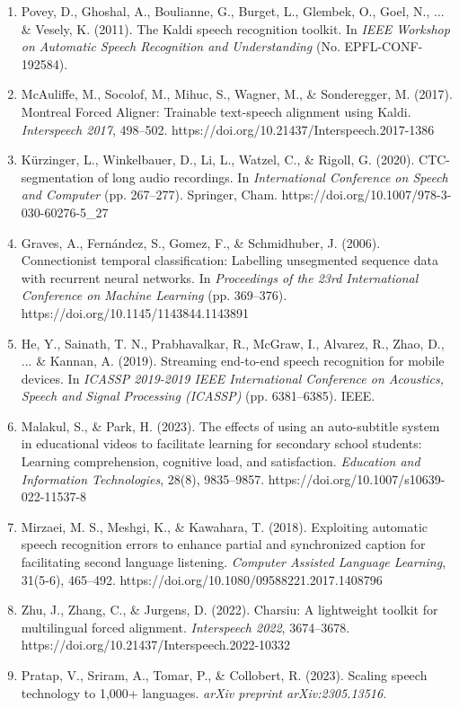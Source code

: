 \documentclass[12pt,a4paper]{article}
\begin{document}
\begin{enumerate}
    \item Povey, D., Ghoshal, A., Boulianne, G., Burget, L., Glembek, O., Goel, N., ... \& Vesely, K. (2011). The Kaldi speech recognition toolkit. In \textit{IEEE Workshop on Automatic Speech Recognition and Understanding} (No. EPFL-CONF-192584).
    \item McAuliffe, M., Socolof, M., Mihuc, S., Wagner, M., \& Sonderegger, M. (2017). Montreal Forced Aligner: Trainable text-speech alignment using Kaldi. \textit{Interspeech 2017}, 498--502. https://doi.org/10.21437/Interspeech.2017-1386
    \item K\"urzinger, L., Winkelbauer, D., Li, L., Watzel, C., \& Rigoll, G. (2020). CTC-segmentation of long audio recordings. In \textit{International Conference on Speech and Computer} (pp. 267--277). Springer, Cham. https://doi.org/10.1007/978-3-030-60276-5_27
    \item Graves, A., Fern\'andez, S., Gomez, F., \& Schmidhuber, J. (2006). Connectionist temporal classification: Labelling unsegmented sequence data with recurrent neural networks. In \textit{Proceedings of the 23rd International Conference on Machine Learning} (pp. 369--376). https://doi.org/10.1145/1143844.1143891
    \item He, Y., Sainath, T. N., Prabhavalkar, R., McGraw, I., Alvarez, R., Zhao, D., ... \& Kannan, A. (2019). Streaming end-to-end speech recognition for mobile devices. In \textit{ICASSP 2019-2019 IEEE International Conference on Acoustics, Speech and Signal Processing (ICASSP)} (pp. 6381--6385). IEEE.
    \item Malakul, S., \& Park, H. (2023). The effects of using an auto-subtitle system in educational videos to facilitate learning for secondary school students: Learning comprehension, cognitive load, and satisfaction. \textit{Education and Information Technologies}, 28(8), 9835--9857. https://doi.org/10.1007/s10639-022-11537-8
    \item Mirzaei, M. S., Meshgi, K., \& Kawahara, T. (2018). Exploiting automatic speech recognition errors to enhance partial and synchronized caption for facilitating second language listening. \textit{Computer Assisted Language Learning}, 31(5-6), 465--492. https://doi.org/10.1080/09588221.2017.1408796
    \item Zhu, J., Zhang, C., \& Jurgens, D. (2022). Charsiu: A lightweight toolkit for multilingual forced alignment. \textit{Interspeech 2022}, 3674--3678. https://doi.org/10.21437/Interspeech.2022-10332
    \item Pratap, V., Sriram, A., Tomar, P., \& Collobert, R. (2023). Scaling speech technology to 1,000+ languages. \textit{arXiv preprint arXiv:2305.13516}.

\end{enumerate}
\end{document}
